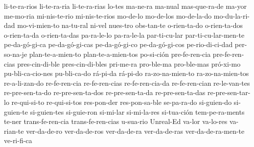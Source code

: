 {li-te-ra-rios
li-te-ra-ria
li-te-ra-rias
lo-tes
ma-ne-ra
ma-nual
mas-que-ra-de
ma-yor
me-mo-ria
mi-nis-te-rio
mi-nis-te-rios
mo-de-lo
mo-de-los
mo-de-la-do
mo-du-la-ri-dad
mo-vi-mien-to
na-tu-ral
ni-vel
nues-tro
obs-tan-te
o-rien-ta-do
o-rien-ta-dos
o-rien-ta-da
o-rien-ta-das
pa-ra-le-lo
pa-ra-le-la
par-ti-cu-lar
par-ti-cu-lar-men-te
pe-da-g\'o-gi-ca
pe-da-g\'o-gi-cas
pe-da-g\'o-gi-co
pe-da-g\'o-gi-cos
pe-rio-di-ci-dad
per-so-na-je
plan-te-a-mien-to
plan-te-a-mien-tos
po-si-ci\'on
pre-fe-ren-cia
pre-fe-ren-cias
pres-cin-di-ble
pres-cin-di-bles
pri-me-ra
pro-ble-ma
pro-ble-mas
pr\'o-xi-mo
pu-bli-ca-cio-nes
pu-bli-ca-do
r\'a-pi-da
r\'a-pi-do
ra-zo-na-mien-to
ra-zo-na-mien-tos
re-a-li-zan-do
re-fe-ren-cia
re-fe-ren-cias
re-fe-ren-cia-da
re-fe-ren-cian
re-le-van-tes
re-pre-sen-ta-do
re-pre-sen-ta-dos
re-pre-sen-ta-da
re-pre-sen-ta-das
re-pre-sen-tar-lo
re-qui-si-to
re-qui-si-tos
res-pon-der
res-pon-sa-ble
se-pa-ra-do
si-guien-do
si-guien-te
si-guien-tes
si-guie-ron
si-mi-lar
si-mi-la-res
si-tua-ci\'on
tem-pe-ra-ments
te-ner
trans-fe-ren-cia
trans-fe-ren-cias
u-sua-rio
Unreal-Ed
va-lor
va-lo-res
va-rian-te
ver-da-de-ro
ver-da-de-ros
ver-da-de-ra
ver-da-de-ras
ver-da-de-ra-men-te
ve-ri-fi-ca
}
